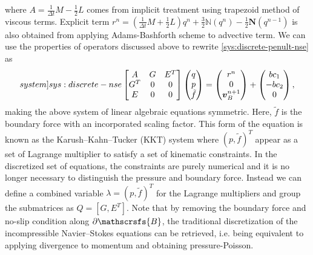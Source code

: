 \documentclass{article}
\numberwithin{equation}{section}
\begin{document}
where $A = \frac{1}{\Delta t} M - \frac{1}{2} L$ comes from implicit treatment using trapezoid method of viscous terms. Explicit term $r^n=\left( \frac{1}{\Delta t}M + \frac{1}{2} L\right)q^n + \frac{3}{2}\mathbb{N}(q^n) - \frac{1}{2}\mathbf{N}(q^{n-1})$ is also obtained from applying Adams-Bashforth scheme to advective term. We can use the properties of operators discussed above to rewrite \cref{sys:discrete-penult-nse} as 
\begin{equation}\label[system]{sys:discrete-nse}
	\begin{bmatrix}{}
  A & G & E^T \\
  G^T& 0& 0\\
  E & 0 & 0
\end{bmatrix}
\begin{pmatrix}{}
	q \\
	p \\
  	\tilde{f}
\end{pmatrix}=
\begin{pmatrix}{}
	r^{n} \\
	0 \\
  	\boldsymbol{v}_B^{n+1}
\end{pmatrix}
+\begin{pmatrix}{}
	bc_1 \\
	-bc_2 \\
  	0
\end{pmatrix},
\end{equation}
making the above system of linear algebraic equations symmetric. 
	Here, $\tilde{f}$ is the boundary force with an incorporated scaling factor. This form of the equation is known as the Karush–Kahn–Tucker (KKT) system where $(p,\tilde{f})^T$ appear as a set of Lagrange multiplier to satisfy a set of kinematic constraints. In the discretized set of equations, the constraints are purely numerical and it is no longer necessary to distinguish the pressure and boundary force. Instead we can define a combined variable $\lambda = (p,\tilde{f})^T$ for the Lagrange multipliers and group the submatrices as $Q = [G, E^T]$. Note that by removing the boundary force and no-slip condition along $\partial \mathscrsfs{B}$, the traditional discretization of the incompressible Navier–Stokes equations can be retrieved, i.e. being equivalent to applying divergence to momentum and obtaining pressure-Poisson.
\end{document}
